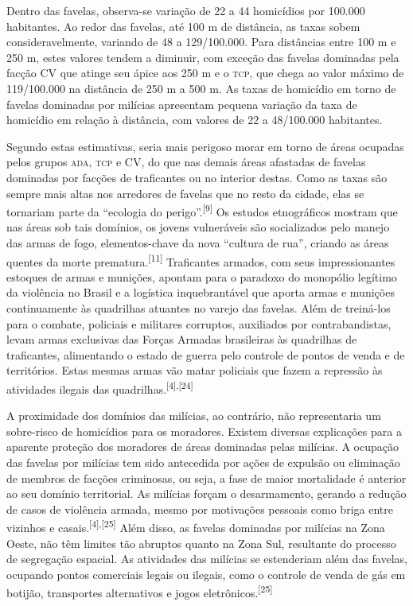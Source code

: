 \documentclass{article}
\begin{document}
Dentro das favelas, observa-se variação de 22 a 44 homicídios por 100.000
habitantes. Ao redor das favelas, até 100 m de distância, as taxas sobem
consideravelmente, variando de 48 a 129/100.000. Para distâncias entre 100 m e
250 m, estes valores tendem a diminuir, com exceção das favelas dominadas pela
facção CV que atinge seu ápice aos 250 m e o \textsc{tcp}, que chega ao valor máximo de
119/100.000 na distância de 250 m a 500 m. As taxas de homicídio em torno de
favelas dominadas por milícias apresentam pequena variação da taxa de homicídio
em relação à distância, com valores de 22 a 48/100.000 habitantes.

Segundo estas estimativas, seria mais perigoso morar em torno de áreas ocupadas
pelos grupos \textsc{ada}, \textsc{tcp} e CV, do que nas demais áreas afastadas de favelas
dominadas por facções de traficantes ou no interior destas. Como as taxas são
sempre mais altas nos arredores de favelas que no resto da cidade, elas se
tornariam parte da “ecologia do perigo”.\textsuperscript{[}\textsuperscript{9}\textsuperscript{]}
Os estudos etnográficos mostram que nas áreas sob tais domínios, os jovens
vulneráveis são socializados pelo manejo das armas de fogo, elementos-chave da
nova “cultura de rua”, criando as áreas quentes da morte
prematura.\textsuperscript{[}\textsuperscript{11}\textsuperscript{]}
Traficantes armados, com seus impressionantes estoques de armas e munições,
apontam para o paradoxo do monopólio legítimo da violência no Brasil e a
logística inquebrantável que aporta armas e munições continuamente às quadrilhas
atuantes no varejo das favelas. Além de treiná-los para o combate, policiais e
militares corruptos, auxiliados por contrabandistas, levam armas exclusivas das
Forças Armadas brasileiras às quadrilhas de traficantes, alimentando o estado de
guerra pelo controle de pontos de venda e de territórios. Estas mesmas armas vão
matar policiais que fazem a repressão às atividades ilegais das
quadrilhas.\textsuperscript{[}\textsuperscript{4}\textsuperscript{]}\textsuperscript{,}\textsuperscript{[}\textsuperscript{24}\textsuperscript{]}

A proximidade dos domínios das milícias, ao contrário, não representaria um
sobre-risco de homicídios para os moradores. Existem diversas explicações para a
aparente proteção dos moradores de áreas dominadas pelas milícias. A ocupação
das favelas por milícias tem sido antecedida por ações de expulsão ou eliminação
de membros de facções criminosas, ou seja, a fase de maior mortalidade é
anterior ao seu domínio territorial. As milícias forçam o desarmamento, gerando
a redução de casos de violência armada, mesmo por motivações pessoais como briga
entre vizinhos e casais.\textsuperscript{[}\textsuperscript{4}\textsuperscript{]}\textsuperscript{,}\textsuperscript{[}\textsuperscript{25}\textsuperscript{]}
Além disso, as favelas dominadas por milícias na Zona Oeste, não têm limites tão
abruptos quanto na Zona Sul, resultante do processo de segregação espacial. As
atividades das milícias se estenderiam além das favelas, ocupando pontos
comerciais legais ou ilegais, como o controle de venda de gás em botijão,
transportes alternativos e jogos
eletrônicos.\textsuperscript{[}\textsuperscript{25}\textsuperscript{]}
\end{document}
